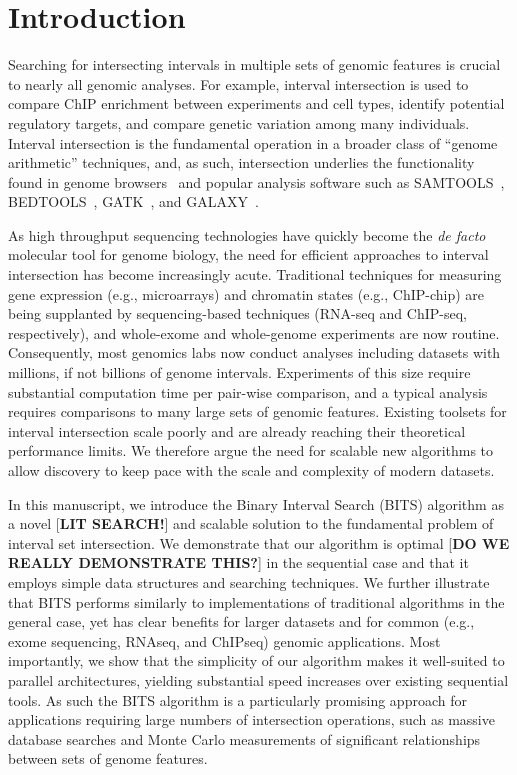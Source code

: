 \documentclass{bioinfo}
\begin{document}
	\section{Introduction}

	Searching for intersecting intervals in multiple sets of genomic features is
	crucial to nearly all genomic analyses. For example, interval intersection is used
	to compare ChIP enrichment between experiments and cell types, identify potential
	regulatory targets, and compare genetic variation among many individuals.
	Interval intersection is the fundamental operation in a broader class of
	``genome arithmetic'' techniques, and, as such, intersection underlies the
	functionality found in genome browsers~\citep{kent2002,robinson2011} and popular
	analysis software such as SAMTOOLS~\citep{li2009}, BEDTOOLS~\citep{quinlan2010}, 
	GATK~\citep{mckenna2010}, and GALAXY~\citep{giardine2005}.

	As high throughput sequencing technologies have quickly become the \emph{de facto}
	molecular tool for genome biology, the need for efficient approaches 
	to interval intersection has become increasingly acute. Traditional techniques 
	for measuring gene expression (e.g., microarrays) and chromatin states (e.g., ChIP-chip) 
	are being supplanted by sequencing-based techniques (RNA-seq and ChIP-seq, respectively), and
	whole-exome and whole-genome experiments are now routine. Consequently, most
	genomics labs now conduct analyses including datasets with millions, if not billions 
	of genome intervals. Experiments of this size require substantial computation time per 
	pair-wise comparison, and a typical analysis requires comparisons to many large
	sets of genomic features. Existing toolsets for interval intersection scale poorly 
	and are already reaching their theoretical performance limits. We therefore argue the
	need for scalable new algorithms to allow discovery to keep pace with the scale and complexity of modern datasets.

	In this manuscript, we introduce the Binary Interval Search (BITS) algorithm 
	as a novel [\textbf{LIT SEARCH!}] and scalable solution to the fundamental problem of interval set 
	intersection.  We demonstrate that our algorithm is optimal [\textbf{DO WE REALLY DEMONSTRATE THIS?}] 
	in the sequential case and that it employs simple data structures and searching techniques.
	We further illustrate that BITS performs similarly to implementations of
	traditional algorithms in the general case, yet has clear benefits for larger datasets and 
	for common (e.g., exome sequencing, RNAseq, and ChIPseq) genomic applications. Most importantly, 
	we show that the simplicity of our algorithm makes it well-suited to parallel architectures,
	yielding substantial speed increases over existing sequential tools.
	As such the BITS algorithm is a particularly promising approach for applications requiring 
	large numbers of intersection operations, such as massive database searches and Monte Carlo 
	measurements of significant relationships between sets of genome features.
\end{document}
